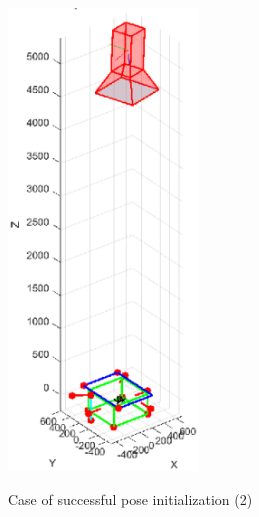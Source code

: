 \begin{figure}[htpb]
{    \includegraphics[width=0.45\textwidth]{gfx/PoseDetermination/cameraWRTSC214.eps}} \hfill
  {\,}
  \caption{Case of successful pose initialization (2)}
  \label{fig:EVVAI2}
\end{figure}

